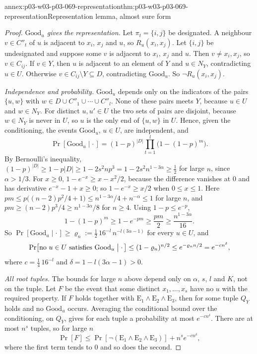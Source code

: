 \begin{annexitem}{annex:p03-w03-p03-069-representation}{thm:p03-w03-p03-069-representation}{Representation lemma, almost sure form}
\begin{proof}
\emph{\(\mathrm{Good}_u\) gives the representation.}  Let \(\pi_t=\{i,j\}\)
be designated.  A neighbour \(v\in C''_t\) of \(u\) is adjacent to \(x_i\),
\(x_j\) and \(u\), so \(R_u(x_i,x_j)\).  Let \(\{i,j\}\) be undesignated and
suppose some \(v\) is adjacent to \(x_i\), \(x_j\) and \(u\).  Then
\(v\neq x_i,x_j\), so \(v\in C_{ij}\).  If \(v\in Y\), then \(u\) is adjacent
to an element of \(Y\) and \(u\in N_Y\), contradicting \(u\in U\).  Otherwise
\(v\in C_{ij}\setminus Y\subseteq D\), contradicting \(\mathrm{Good}_u\).  So
\(\neg R_u(x_i,x_j)\).

\emph{Independence and probability.}  \(\mathrm{Good}_u\) depends only on the
indicators of the pairs \(\{u,w\}\) with \(w\in D\cup C''_1\cup\cdots\cup
C''_l\).  None of these pairs meets \(Y\), because \(u\in U\) and \(w\in
N_Y\).  For distinct \(u,u'\in U\) the two sets of pairs are disjoint,
because \(w\in N_Y\) is never in \(U\), so \(u\) is the only end of
\(\{u,w\}\) in \(U\).  Hence, given the conditioning, the events
\(\mathrm{Good}_u\), \(u\in U\), are independent, and
\[
  \Pr[\mathrm{Good}_u\mid\cdot\,]=(1-p)^{|D|}\prod_{t=1}^{l}\bigl(1-(1-p)^{m}\bigr).
\]
By Bernoulli's inequality, \((1-p)^{|D|}\geq1-p|D|\geq1-2s^2np^3
=1-2s^2n^{1-3\alpha}\geq\tfrac12\) for large \(n\), since \(\alpha>1/3\).  For
\(x\geq0\), \(1-e^{-x}\geq x-x^2/2\), because the difference vanishes at
\(0\) and has derivative \(e^{-x}-1+x\geq0\); so \(1-e^{-x}\geq x/2\) when
\(0\leq x\leq1\).  Here \(pm\leq p\bigl((n-2)p^2/4+1\bigr)\leq
n^{1-3\alpha}/4+n^{-\alpha}\leq1\) for large \(n\), and
\(pm\geq(n-2)p^3/4\geq n^{1-3\alpha}/8\) for \(n\geq4\).  Using
\(1-p\leq e^{-p}\),
\[
  1-(1-p)^m\geq1-e^{-pm}\geq\frac{pm}{2}\geq\frac{n^{1-3\alpha}}{16}.
\]
So \(\Pr[\mathrm{Good}_u\mid\cdot\,]\geq\varrho_n:=\tfrac12\,
16^{-l}\,n^{-l(3\alpha-1)}\) for every \(u\in U\), and
\[
  \Pr\bigl[\text{no }u\in U\text{ satisfies }\mathrm{Good}_u\bigm|\cdot\,\bigr]
  \leq(1-\varrho_n)^{n/2}\leq e^{-\varrho_nn/2}=e^{-cn^{\delta}},
\]
where \(c=\tfrac14\,16^{-l}\) and \(\delta=1-l(3\alpha-1)>0\).

\emph{All root tuples.}  The bounds for large \(n\) above depend only on
\(\alpha\), \(s\), \(l\) and \(K\), not on the tuple.  Let \(F\) be the event
that some distinct \(x_1,\ldots,x_s\) have no \(u\) with the required
property.  If \(F\) holds together with \(\mathrm E_1\wedge\mathrm
E_2\wedge\mathrm E_3\), then for some tuple \(Q_Y\) holds and no
\(\mathrm{Good}_u\) occurs.  Averaging the conditional bound over the
conditioning, on \(Q_Y\), gives for each tuple a probability at most
\(e^{-cn^\delta}\).  There are at most \(n^s\) tuples, so for large \(n\)
\[
  \Pr[F]\leq\Pr[\neg(\mathrm E_1\wedge\mathrm E_2\wedge\mathrm E_3)]
  +n^se^{-cn^{\delta}},
\]
where the first term tends to \(0\) and so does the second.
\end{proof}
\end{annexitem}

